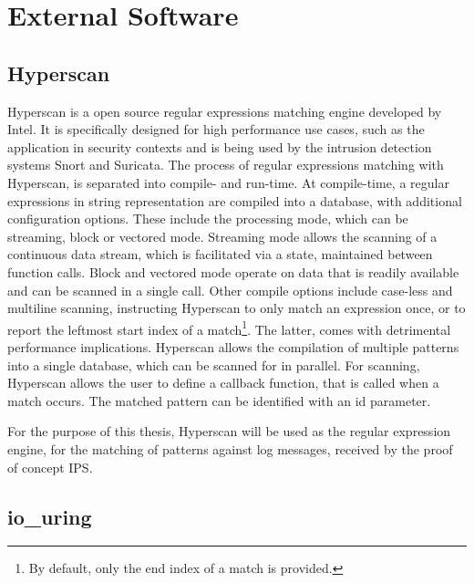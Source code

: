 \section{External Software} \label{sec:software}

\subsection{Hyperscan} \label{sec:hyperscan}
 
Hyperscan is a open source regular expressions matching engine developed by Intel. 
It is specifically designed for high performance use cases, such as the application in security contexts and is being used by the intrusion detection systems Snort and Suricata.  
The process of regular expressions matching with Hyperscan, is separated into compile- and run-time. At compile-time, a regular expressions in string representation are compiled into a 
database, with additional configuration options. These include the processing mode, which 
can be streaming, block or vectored mode. Streaming mode allows the scanning of a continuous data stream,
which is facilitated via a state, maintained between function calls. Block and vectored mode operate on data
that is readily available and can be scanned in a single call. Other compile options include 
case-less and multiline scanning, instructing Hyperscan to only match an expression
once, or to report the leftmost start index of a match\footnote{By default, only the end index of a match is provided.}. The latter, comes with detrimental performance implications.
Hyperscan allows the compilation
of multiple patterns into a single database, which can be scanned for in parallel. 
For scanning, Hyperscan allows the user to define a callback function, that is 
called when a match occurs. The matched pattern can be identified with an id parameter. \cite{hyperscan}
\par 
For the purpose of this thesis, Hyperscan will be used as the regular expression engine, for
the matching of patterns against log messages, received by the proof of concept \ac{IPS}.    

\subsection{io\_uring} \label{sec:io_uring}

